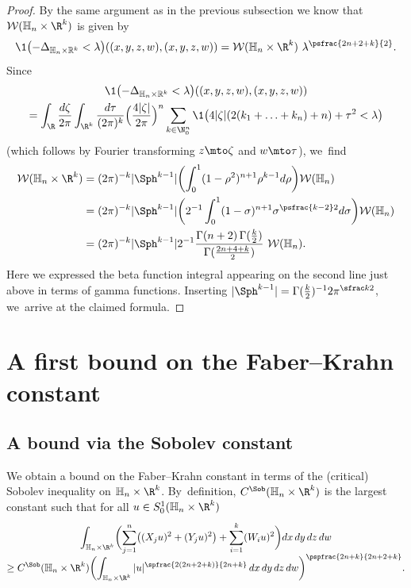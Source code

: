 \begin{proof}
By the same argument as in the previous subsection we know that $\mathcal W(\mathbb H_n\times\nobreak\R^k)$ is given by\vspace*{-3pt}
\begin{equation*}
\1\bigl(-\Delta_{\mathbb H_n\times \mathbb R^k}<\lambda\bigr)((x,y,z,w),(x,y,z,w))=\mathcal W(\mathbb H_n\times\R^k)\ \lambda^{\psfrac{2n+2+k}{2}}.
\end{equation*}
Since\vspace*{-3pt}
\begin{multline*}
\1\bigl(-\Delta_{\mathbb H_n\times \mathbb R^k}<\lambda\bigr)((x,y,z,w),(x,y,z,w)) \\
= \int_\R \frac{d\zeta}{2\pi} \int_{\R^k} \frac{d\tau}{(2\pi)^k} \Bigl(\frac{4|\zeta|}{2\pi}\Bigr)^n \sum_{k \in\N_0^n} \1\bigl(4|\zeta|(2(k_1+\ldots+k_n)+n)+ \tau^2<\lambda\bigr)
\end{multline*}
(which follows by Fourier transforming $z\mto \zeta$ and $w\mto \tau$), we~find\vspace*{-3pt}
\begin{align*}\label{sp2}
\mathcal W(\mathbb H_n\times\R^k) & = (2\pi)^{ - k} |\Sph^{k-1}| \biggl(\int_0^1(1-\rho^2)^{n+1} \rho^{k-1} d\rho\biggr) \mathcal W(\mathbb H_n) \\
& = (2\pi)^{ - k} |\Sph^{k-1}| \biggl(2^{-1} \int_0^1(1-\sigma)^{n+1} \sigma^{\psfrac{k-2}2} d\sigma \biggr) \mathcal W(\mathbb H_n) \\
& = (2\pi)^{ - k} |\Sph^{k-1}| 2^{-1} \frac{\Gamma(n+2)\,\Gamma(\frac k2)}{\Gamma(\frac{2n+4+k}{2})} \ \mathcal W(\mathbb H_n).
\end{align*}
Here we expressed the beta function integral appearing on the second line just above in terms of gamma functions. Inserting $|\Sph^{k-1}| = \Gamma(\frac k2)^{-1} 2 \pi^{\sfrac k2}$, we~arrive at the claimed formula.
\end{proof}

\section{A first bound on the Faber--Krahn constant}\label{sec:fksob}

\subsection{A bound via the Sobolev constant}
We obtain a bound on the Faber--Krahn constant in terms of the (critical) Sobolev inequality on $\mathbb H_n\times\R^k$. By~definition, $C^\Sob(\mathbb H_n\times\R^k)$ is the largest constant such that for all $u\in S^1_0(\mathbb H_n\times\R^k)$\vspace*{-3pt}
\begin{multline*}
\int_{\mathbb H_n\times\R^k} \biggl(\sum_{j=1}^n \bigl((X_ju)^2 + (Y_ju)^2\bigr) + \sum_{i=1}^k (W_iu)^2\biggr) dx\,dy\,dz\,dw \\[-5pt]
\geq C^\Sob(\mathbb H_n\times\R^k) \biggl(\int_{\mathbb H_n\times\R^k} |u|^{\spfrac{2(2n+2+k)}{2n+k}} \,dx\,dy\,dz\,dw \biggr)^{\pspfrac{2n+k}{2n+2+k}}.
\end{multline*}

